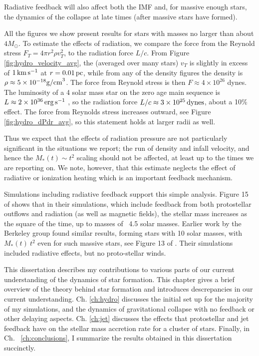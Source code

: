 \documentclass[../dissertation.tex]{subfiles}
\begin{document}
Radiative feedback will also affect both the IMF and, for massive enough stars, the dynamics of the collapse at late times (after massive stars have formed). 

All the figures we show present results for stars with masses no larger than about $4 M_\odot$. To estimate the effects of radiation, we compare the force from the Reynold stress $F_T=4\pi r^2 \rho v_T^2$, to the radiation force $L/c$. 
From Figure \ref{fig:hydro_velocity_avg}, the (averaged over many stars) $v_T$ is slightly in excess of $1\,\rm km\,s^{-1}$ at $r=0.01\,\rm pc$, while from any of the density figures the density is $\rho\approx5\times10^{-18} {\rm g/cm}^3$. The force from Reynold stress is then $F\approx4\times 10^{26}$ dynes. The luminosity of a 4 solar mass star on the zero age main sequence is $L\approx 2\times10^{36}\,\rm erg\, s^{-1}$ \citep{1992A&AS...96..269S}, so the radiation force $L/c \approx 3\times10^{25}\,{\rm dynes}$, about a 10\% effect.  The force from Reynolds stress increases outward, see Figure \ref{fig:hydro_dPdr_avg}, so this statement holds at larger radii as well. 

Thus we expect that the effects of radiation pressure are not particularly significant in the situations we report;  the run of density and infall velocity, and hence the $M_*(t)\sim t^2$ scaling should not be affected, at least up to the times we are reporting on.  We note, however, that this estimate neglects the effect of radiative or ionization heating which is an important feedback mechanism.

Simulations including radiative feedback support this simple analysis. Figure 15 of  \citet{2014MNRAS.439.3420M} shows that in their simulations, which include feedback from both protostellar outflows and radiation (as well as magnetic fields), the stellar mass increases as the square of the time, up to masses of ~4.5 solar masses. Earlier work by the Berkeley group found similar results, forming stars with 10 solar masses, with $M_*(t)~ t^2$ even for such massive stars, see Figure 13 of \citet{2012ApJ...754...71K}. Their simulations included radiative effects, but no proto-stellar winds. 




This dissertation describes my contributions to various parts of our current understanding of the dynamics of star formation. 
This chapter gives a brief overview of the theory behind star formation and introduces descrepancies in our current understanding. 
Ch. \ref{ch:hydro} discusses the initial set up for the majority of my simulations, and the dynamics of gravitational collapse with no feedback or other delaying aspects.
Ch. \ref{ch:jet} discusses the effects that protostellar and jet feedback have on the stellar mass accretion rate for a cluster of stars.
Finally, in Ch. ~\ref{ch:conclusions}, I summarize the results obtained in this dissertation succinctly.
\end{document}
